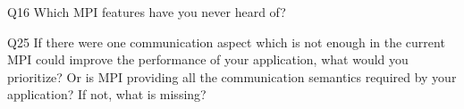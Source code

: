 \begin{description}%
\item{Q16} Which MPI features have you never heard of?%
\item{Q25} If there were one communication aspect which is not enough in the current MPI could improve the performance of your application, what would you prioritize? Or is MPI providing all the communication semantics required by your application? If not, what is missing?%
\end{description}%
